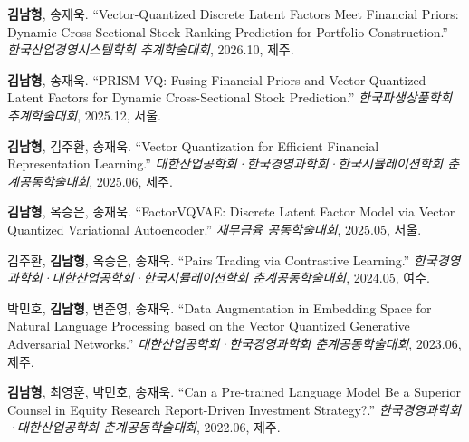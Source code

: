 \documentclass[11pt]{article}
\begin{document}
\begin{nlist}
\item[{[7]}] \textbf{김남형}, 송재욱\cvmark{*}. ``Vector-Quantized Discrete Latent Factors Meet Financial Priors: Dynamic Cross-Sectional Stock Ranking Prediction for Portfolio Construction.'' \textit{한국산업경영시스템학회 추계학술대회}, 2026.10, 제주.
\item[{[6]}] \textbf{김남형}, 송재욱\cvmark{*}. ``PRISM-VQ: Fusing Financial Priors and Vector-Quantized Latent Factors for Dynamic Cross-Sectional Stock Prediction.'' \textit{한국파생상품학회 추계학술대회}, 2025.12, 서울.
\item[{[5]}] \textbf{김남형}, 김주환, 송재욱\cvmark{*}. ``Vector Quantization for Efficient Financial Representation Learning.'' \textit{대한산업공학회·한국경영과학회·한국시뮬레이션학회 춘계공동학술대회}, 2025.06, 제주.
\item[{[4]}] \textbf{김남형}, 옥승은, 송재욱\cvmark{*}. ``FactorVQVAE: Discrete Latent Factor Model via Vector Quantized Variational Autoencoder.'' \textit{재무금융 공동학술대회}, 2025.05, 서울.
\item[{[3]}] 김주환, \textbf{김남형}, 옥승은, 송재욱\cvmark{*}. ``Pairs Trading via Contrastive Learning.'' \textit{한국경영과학회·대한산업공학회·한국시뮬레이션학회 춘계공동학술대회}, 2024.05, 여수.
\item[{[2]}] 박민호, \textbf{김남형}, 변준영, 송재욱\cvmark{*}. ``Data Augmentation in Embedding Space for Natural Language Processing based on the Vector Quantized Generative Adversarial Networks.'' \textit{대한산업공학회·한국경영과학회 춘계공동학술대회}, 2023.06, 제주.
\item[{[1]}] \textbf{김남형}, 최영훈, 박민호, 송재욱\cvmark{*}. ``Can a Pre-trained Language Model Be a Superior Counsel in Equity Research Report-Driven Investment Strategy?.'' \textit{한국경영과학회·대한산업공학회 춘계공동학술대회}, 2022.06, 제주.
\end{nlist}
\end{document}
